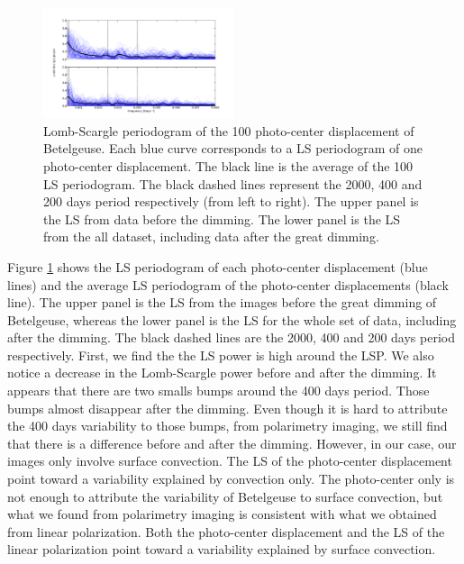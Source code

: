 \documentclass{aa}
\begin{document}
\begin{figure}[!h]
    \centering
    \includegraphics[width=0.5\textwidth]{Lomb-Scargle Photo-center.png}
    \caption{Lomb-Scargle periodogram of the 100 photo-center displacement of Betelgeuse. Each blue curve corresponds to a LS periodogram of one photo-center
     displacement. The black line is the average of the 100 LS periodogram. The black dashed lines represent the 2000, 400 and 200 days period respectively 
     (from left to right). The upper panel is the LS from data before the dimming. The lower panel is the LS from the all dataset, 
     including data after the great dimming. }
    \label{LS photocenter}
\end{figure}

Figure \ref{LS photocenter} shows the LS periodogram of each photo-center displacement (blue lines) and the average LS periodogram of the photo-center displacements (black line). 
The upper panel is the LS from the images before the great dimming of Betelgeuse, whereas the lower panel is the LS for the whole set of data, 
including after the dimming. The black dashed lines are the 2000, 400 and 200 days period respectively. First, we find the the LS power is high around the LSP.
We also notice a decrease in the Lomb-Scargle power before and after the dimming. It appears that there are two smalls bumps around the 400 days period. 
Those bumps almost disappear after the dimming. Even though it is hard to attribute the 400 days variability to those bumps, from polarimetry imaging,
we still find that there is a difference before and after the dimming. However, in our case, our images only involve surface convection.
The LS of the photo-center displacement point toward a variability explained by convection only. The photo-center only is not enough to attribute the variability
of Betelgeuse to surface convection, but what we found from polarimetry imaging is consistent with what we obtained from linear polarization.
Both the photo-center displacement and the LS of the linear polarization point toward a variability explained by surface convection.  
\end{document}
